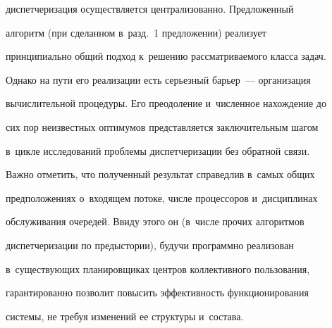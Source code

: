 диспетчеризация осуществляется централизованно. Предложенный 


алгоритм (при сделанном в~разд.~1 предложении) реализует 


принципиально общий подход к~решению рассматриваемого класса задач. 


Однако на пути его реализации есть серьезный барьер~--- организация 


вычислительной процедуры. Его преодоление и~численное нахождение до 


сих пор неизвестных оптимумов представляется заключительным шагом 


в~цикле исследований проблемы диспетчеризации без обратной связи.


  


  Важно отметить, что полученный результат справедлив в~самых общих 


предположениях о~входящем потоке, числе процессоров и~дисциплинах 


обслуживания очередей. Ввиду этого он (в~числе прочих алгоритмов 


диспетчеризации по предыстории), будучи программно реализован 


в~существующих планировщиках центров коллективного пользования, 


гарантированно позволит повысить эффективность функционирования 


системы, не требуя изменений ее структуры и~состава. 






